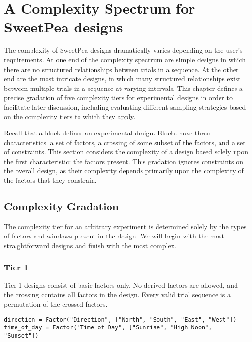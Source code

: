 
\chapter{A Complexity Spectrum for SweetPea designs}

The complexity of SweetPea designs dramatically varies depending on the user's requirements. At one end of the complexity spectrum are simple designs in which there are no structured relationships between trials in a sequence. At the other end are the most intricate designs, in which many structured relationships exist between multiple trials in a sequence at varying intervals. This chapter defines a precise gradation of five complexity tiers for experimental designs in order to facilitate later discussion, including evaluating different sampling strategies based on the complexity tiers to which they apply.

Recall that a block defines an experimental design. Blocks have three characteristics: a set of factors, a crossing of some subset of the factors, and a set of constraints. This section considers the complexity of a design based solely upon the first characteristic: the factors present. This gradation ignores constraints on the overall design, as their complexity depends primarily upon the complexity of the factors that they constrain.

\section{Complexity Gradation}

The complexity tier for an arbitrary experiment is determined solely by the types of factors and windows present in the design. We will begin with the most straightforward designs and finish with the most complex.

\subsection{Tier 1}

Tier 1 designs consist of basic factors only. No derived factors are allowed, and the crossing contains all factors in the design. Every valid trial sequence is a permutation of the crossed factors.

\begin{verbatim}
direction = Factor("Direction", ["North", "South", "East", "West"])
time_of_day = Factor("Time of Day", ["Sunrise", "High Noon", "Sunset"])
\end{verbatim}

